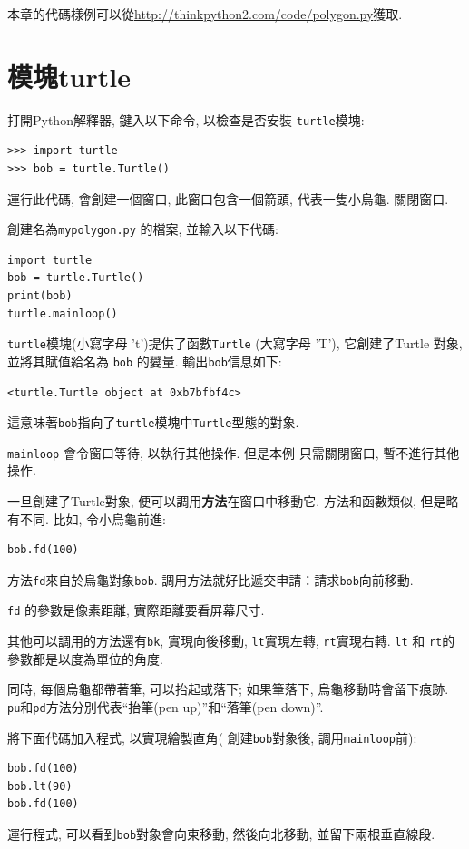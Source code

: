 \documentclass[10pt]{book}
\begin{document}
本章的代碼樣例可以從\url{http://thinkpython2.com/code/polygon.py}獲取. 


\section{模塊turtle}
\label{turtle}

打開Python解釋器, 鍵入以下命令, 以檢查是否安裝 {\tt turtle}模塊:

\begin{verbatim}
>>> import turtle
>>> bob = turtle.Turtle()
\end{verbatim}

運行此代碼, 會創建一個窗口, 此窗口包含一個箭頭, 代表一隻小烏龜. 
關閉窗口. 

創建名為{\tt mypolygon.py} 的檔案, 並輸入以下代碼:

\begin{verbatim}
import turtle
bob = turtle.Turtle()
print(bob)
turtle.mainloop()
\end{verbatim}
%
 {\tt turtle}模塊(小寫字母 't')提供了函數{\tt Turtle} (大寫字母 'T'), 
它創建了Turtle 對象, 並將其賦值給名為 {\tt bob} 的變量. 
輸出{\tt bob}信息如下:

\begin{verbatim}
<turtle.Turtle object at 0xb7bfbf4c>
\end{verbatim}
%
這意味著{\tt bob}指向了{\tt turtle}模塊中{\tt Turtle}型態的對象.

\verb"mainloop" 會令窗口等待, 以執行其他操作. 但是本例
只需關閉窗口, 暫不進行其他操作. 

一旦創建了Turtle對象, 便可以調用{\bf 方法}在窗口中移動它. 
方法和函數類似, 但是略有不同. 比如, 令小烏龜前進:

\begin{verbatim}
bob.fd(100)
\end{verbatim}
%
方法{\tt fd}來自於烏龜對象{\tt bob}. 
調用方法就好比遞交申請：請求{\tt bob}向前移動. 

{\tt fd} 的參數是像素距離, 實際距離要看屏幕尺寸. 

其他可以調用的方法還有{\tt bk}, 實現向後移動, 
{\tt lt}實現左轉, {\tt rt}實現右轉. 
{\tt lt} 和 {\tt rt}的參數都是以度為單位的角度. 

同時, 每個烏龜都帶著筆, 可以抬起或落下;
如果筆落下, 烏龜移動時會留下痕跡. 
{\tt pu}和{\tt pd}方法分別代表``抬筆(pen up)''和``落筆(pen down)''.

將下面代碼加入程式, 以實現繪製直角(
創建{\tt bob}對象後, 調用\verb"mainloop"前):

\begin{verbatim}
bob.fd(100)
bob.lt(90)
bob.fd(100)
\end{verbatim}
%
運行程式, 可以看到{\tt bob}對象會向東移動, 然後向北移動, 並留下兩根垂直線段. 
\end{document}
